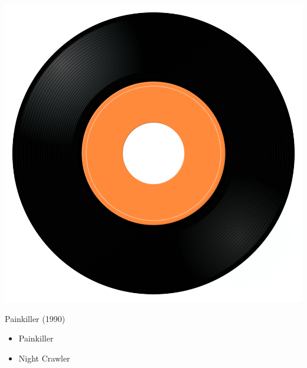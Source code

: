 \begin{minipage}[t]{0.25\textwidth}\vspace{0pt}
\captionsetup{type=figure}
\includegraphics[width=\textwidth]{Images/cover.png}
\caption*{Painkiller (1990)}
\end{minipage}
\begin{minipage}[t]{0.25\textwidth}\vspace{0pt}
\begin{itemize}[nosep,leftmargin=1em,labelwidth=*,align=left]
	\setlength{\itemsep}{0pt}
	\item Painkiller
	\item Night Crawler
\end{itemize}
\end{minipage}
